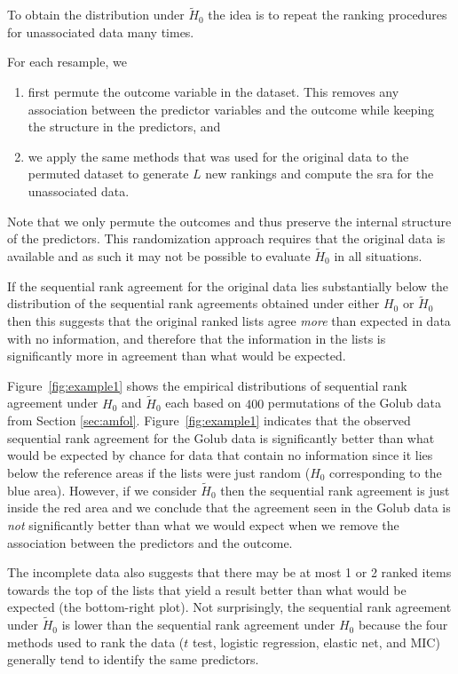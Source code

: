 \documentclass[oupdraft]{bio}
\newcommand{\added}[1]{{\color{added}{}#1}}
\begin{document}
To obtain the distribution under $\widetilde H_0$ the idea is to
repeat the ranking procedures for unassociated data many times.
\added{For each resample, we
  \begin{enumerate}
  \item first permute the outcome variable in the dataset. This
    removes any association between the predictor variables and the
    outcome while keeping the structure in the predictors, and 
  \item we apply the same methods that was used for the original data to the permuted dataset to generate $L$
    new rankings and compute the sra for the unassociated data.
  \end{enumerate}
} Note that we only permute the outcomes and thus preserve the
internal structure of the predictors. This randomization approach
requires that the original data is available and as such it may not be
possible to evaluate $\widetilde H_0$ in all situations.

If the sequential rank agreement for the original data lies
substantially below the distribution of the sequential rank agreements
obtained under either $H_0$ or $\widetilde H_0$ then this suggests that
the original ranked lists agree \emph{more} than expected
in data with no information, and therefore that the information in the
lists is significantly more in agreement than what would be expected.

Figure~\ref{fig:example1} shows the empirical distributions of
sequential rank agreement under $H_0$ and $\widetilde H_0$ each based
on $400$ permutations of the Golub data from Section \ref{sec:amfol}.
\added{ Figure~\ref{fig:example1} indicates that the observed
  sequential rank agreement for the Golub data is significantly better
  than what would be expected by chance for data that contain no
  information since it lies below the reference areas if the lists
  were just random ($H_0$ corresponding to the blue area). However, if
  we consider $\widetilde H_0$ then the sequential rank agreement is
  just inside the red area and we conclude that the agreement seen in
  the Golub data is \emph{not} significantly better than what we would
  expect when we remove the association between the predictors and
  the outcome.}


The incomplete data also suggests that there may be at most 1 or 2
ranked items towards the top of the lists that yield a result better
than what would be expected (the bottom-right plot). Not surprisingly,
the sequential rank agreement under $\widetilde H_0$ is lower than the
sequential rank agreement under $H_0$ because the four methods used to
rank the data ($t$ test, logistic regression, elastic net, and MIC)
generally tend to identify the same predictors.
\end{document}
